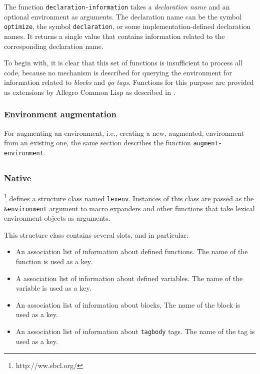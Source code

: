 The function \texttt{declaration-information} takes a
\emph{declaration name} and an optional environment as arguments.  The
declaration name can be the symbol \texttt{optimize}, the symbol
\texttt{declaration}, or some implementation-defined declaration
names.  It returns a single value that contains information related to
the corresponding declaration name.

To begin with, it is clear that this set of functions is insufficient
to process all \commonlisp{} code, because no mechanism is described
for querying the environment for information related to \emph{blocks}
and \emph{go tags}.  Functions for this purpose are provided as
extensions by Allegro Common Lisp as described in
.

\subsubsection{Environment augmentation}

For augmenting an environment, i.e., creating a new, augmented,
environment from an existing one, the same section describes the
function \texttt{augment-environment}.

\subsection{\sbcl{}}

\subsubsection{Native}

\sbcl{}%
\footnote{http://ww.sbcl.org/}
defines a structure class named \texttt{lexenv}.  Instances of
this class are passed as the \texttt{\&environment} argument to macro
expanders and other functions that take lexical environment objects as
arguments.

This structure class contains several slots, and in particular:
\begin{itemize}
\item An association list of information about defined functions.
  The name of the function is used as a key.
\item A association list of information about defined variables.
  The name of the variable is used as a key.
\item An association list of information about blocks,
  The name of the block is used as a key.
\item An association list of information about \texttt{tagbody} tags.
  The name of the tag is used as a key.
\end{itemize}

